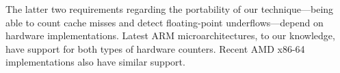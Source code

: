 The latter two requirements regarding
the portability of our technique---being able to 
count cache misses and detect floating-point underflows---depend
on hardware implementations. Latest ARM microarchitectures, to our knowledge,
have support for both types of hardware counters.
Recent AMD x86-64 implementations also 
have similar support.
